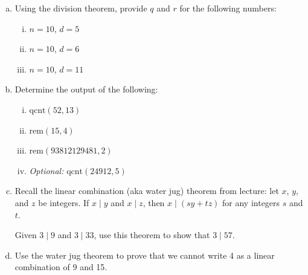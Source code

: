 \documentclass[12pt,letterpaper]{article}
\newif\ifsol
\newcommand{\solu}[2]{ \begin{mdframed} \ifsol #2 \else \vspace{#1} \fi \end{mdframed} }
\begin{document}
	\begin{enumerate}[a.]
	    \item Using the division theorem, provide $q$ and $r$ for the following numbers:
	    
	    \begin{enumerate}[i.]
	        \item $n = 10$, $d = 5$
	        \solu{1 cm}{$10 = 2 \cdot 5 + 0$, $q = 2$, $r = 0$}
	        
	        \item $n = 10$, $d = 6$
	        \solu{1 cm}{$10 = 1 \cdot 6 + 4$, $q = 1$, $r = 4$}
	        
	        \item $n = 10$, $d = 11$
	        \solu{1 cm}{$10 = 0 \cdot 11 + 10$, $q = 0$, $r = 10$}
	    \end{enumerate}
	    
	    \item Determine the output of the following:
	    
	    \begin{enumerate}[i.]
	        \item  $\text{qcnt}(52,13)$  %
	        \solu{1 cm}{4}
	        
	        \item  $\text{rem}(15,4)$  %
	        \solu{1 cm}{3}
	        
	        \item  $\text{rem}(93812129481,2)$
	        \solu{1 cm}{1}
	        
	        \item  \textit{Optional:} $\text{qcnt}(24912,5)$  %
	        \solu{1 cm}{4982 (solving for $r = 2$ first will make this easier)}
	    \end{enumerate}
	    
	    \item
	    Recall the linear combination (aka water jug) theorem from lecture: let $x$, $y$, and $z$ be integers. If $x \mid y$ and $x \mid z$, then $x \mid (sy + tz)$ for any integers $s$ and $t$.
	    
	    Given $3 \mid 9$ and $3 \mid 33$, use this theorem to show that $3 \mid 57$.
	    \solu{2 cm}{We can re-write $57$ as a linear combination of $9$ and $33$; for example, $9\cdot(-1)+33\cdot 2=57$. Thus, $3 \mid 57$ by the water jug theorem.}
	    
	     \item
	     Use the water jug theorem to prove that we cannot write 4 as a linear combination of 9 and 15. 
	     
	     \solu{2cm}{
	     Assume for the sake of contradiction that there exists $s, t$ such that $4 = 9s + 15t$. We know that $3 \mid 9$ and $3 \mid 15$, so by the water jug theorem, $3 \mid 9s + 15t$. However, $3 \nmid 4$, so this is a contradiction.
	     }
	\end{enumerate}
	
\end{document}
